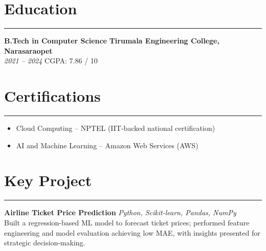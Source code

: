 \documentclass[10pt]{article}
\begin{document}
\section*{Education}
\vspace{1pt}\hrule\vspace{4pt}
\textbf{B.Tech in Computer Science} \hfill \textbf{Tirumala Engineering College, Narasaraopet} \\
\textit{2021 -- 2024} \quad CGPA: 7.86 / 10

\section*{Certifications}
\vspace{1pt}\hrule\vspace{4pt}
\begin{itemize}
  \item Cloud Computing -- NPTEL (IIT-backed national certification)
  \item AI and Machine Learning -- Amazon Web Services (AWS)
\end{itemize}

\section*{Key Project}
\vspace{1pt}\hrule\vspace{4pt}
\textbf{Airline Ticket Price Prediction} \hfill \textit{Python, Scikit-learn, Pandas, NumPy} \\
Built a regression-based ML model to forecast ticket prices; performed feature engineering and model evaluation achieving low MAE, with insights presented for strategic decision-making.
\end{document}
